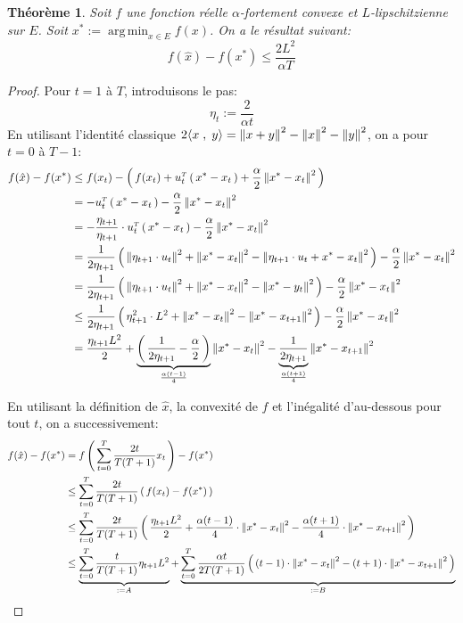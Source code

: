 \documentclass[11pt]{article}
\DeclareMathOperator*{\argmin}{arg\,min} %
\newcommand{\transpose}[1]{\ensuremath{#1^{\scriptscriptstyle T}}}
\newcommand{\dotpourvariable}{\:\cdot\:}
\newcommand{\ifempty}[3]{\ifx\hfuzz#1\hfuzz #2 \else #3\fi}
\newcommand{\norme}[1]{\left\lVert\ifempty{#1}{\dotpourvariable}{#1}\right\rVert}
\newcommand{\prt}[1]{\left( \, #1  \, \right)}
\newcommand{\ps}[2]{ \langle #1 \;,\; #2  \rangle}
\newtheorem{theorem}{Théorème}[section]
\begin{document}
\pagestyle{empty}
\vspace {-3cm}

 \selectfont


\begin{theorem}

Soit $f$ une fonction réelle $\alpha$-fortement convexe et $L$-lipschitzienne sur
$E$. Soit $x^{*}:= \argmin_{x\in E} f(x)$. On a le résultat suivant:
\begin{equation}
f(\hat{x})-f(x^{*}) \leq \frac{2 L^2}{\alpha T}
\end{equation}
\end{theorem}

\begin{proof}
Pour $t=1$ à $T$, introduisons le pas:
\begin{equation}
  \eta_t := \frac{2}{\alpha t}
\end{equation}
En utilisant l'identité classique $2\ps{x}{y} = \norme{x+y}^2-\norme{x}^2-\norme{y}^2$, on a pour $t=0$ à $T-1$:
\begin{align*}
f(\hat{x})-f(x^{*}) &\leq f(x_t)-\prt{f(x_t) + \transpose{u_t}\prt{x^{*}-x_t}
+ \frac{\alpha}{2} \norme{x^{*}-x_t}^2}\\
&= -\transpose{u_t}\prt{x^{*}-x_t}
- \frac{\alpha}{2} \norme{x^{*}-x_t}^2\\
&= -\frac{\eta_{t+1}}{\eta_{t+1}} \cdot \transpose{u_t}\prt{x^{*}-x_t}
- \frac{\alpha}{2} \norme{x^{*}-x_t}^2\\
&= \frac{1}{2 \eta_{t+1} }\prt{\norme{\eta_{t+1} \cdot u_t}^2+\norme{x^{*}-x_t}^2-\norme{\eta_{t+1} \cdot u_t+x^{*}-x_t}^2
}- \frac{\alpha}{2} \norme{x^{*}-x_t}^2\\
&= \frac{1}{2 \eta_{t+1} }\prt{\norme{\eta_{t+1} \cdot u_t}^2+\norme{x^{*}-x_t}^2-\norme{ x^{*}-y_t}^2
}- \frac{\alpha}{2} \norme{x^{*}-x_t}^2\\
&\leq  \frac{1}{2 \eta_{t+1} }\prt{\eta_{t+1}^2\cdot L^2+\norme{x^{*}-x_t}^2-\norme{x^{*}-x_{t+1}}^2
}- \frac{\alpha}{2} \norme{x^{*}-x_t}^2\\
&= \frac{\eta_{t+1} L^2}{2} + \underbrace{\prt{\frac{1}{2 \eta_{t+1} } - \frac{\alpha}{2}}}_{\frac{\alpha (t-1)}{4}} \norme{x^{*}-x_t}^2
- \underbrace{\frac{1}{2 \eta_{t+1} }}_{\frac{\alpha (t+1)}{4}} \norme{x^{*}-x_{t+1}}^2
\end{align*}

En utilisant la définition de $\hat{x}$, la convexité de $f$ et l'inégalité d'au-dessous pour tout $t$, on a successivement:
\begin{align*}
  f(\hat{x})-f(x^{*}) &= f\prt{\sum_{t=0}^T \frac{2t}{T(T+1)} x_t}-f(x^{*})\\
  &\leq  \sum_{t=0}^T \frac{2t}{T(T+1)} \prt{f(x_t)-f(x^{*})}\\
  &\leq  \sum_{t=0}^T \frac{2t}{T(T+1)} \prt{\frac{\eta_{t+1} L^2}{2}+\frac{\alpha (t-1)}{4} \cdot \norme{x^{*}-x_t}^2-\frac{\alpha (t+1)}{4} \cdot  \norme{x^{*}-x_{t+1}}^2}\\
  &\leq  \underbrace{\sum_{t=0}^T \frac{t}{T(T+1)} \eta_{t+1} L^2}_{:=A}+\underbrace{\sum_{t=0}^T \frac{\alpha t}{2T(T+1)}  \prt{(t-1) \cdot \norme{x^{*}-x_t}^2-(t+1) \cdot  \norme{x^{*}-x_{t+1}}^2}}_{:=B}\\
\end{align*}


\end{proof}
\end{document}
